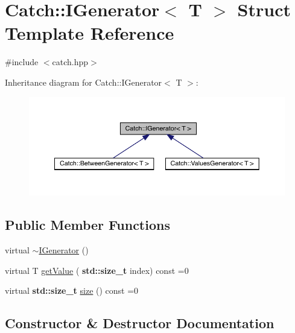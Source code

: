 \hypertarget{struct_catch_1_1_i_generator}{}\section{Catch\+:\+:I\+Generator$<$ T $>$ Struct Template Reference}
\label{struct_catch_1_1_i_generator}


{\ttfamily \#include $<$catch.\+hpp$>$}



Inheritance diagram for Catch\+:\+:I\+Generator$<$ T $>$\+:
\nopagebreak
\begin{figure}[H]
\begin{center}
\leavevmode
\includegraphics[width=350pt]{struct_catch_1_1_i_generator__inherit__graph}
\end{center}
\end{figure}
\subsection*{Public Member Functions}
\begin{DoxyCompactItemize}
\item 
virtual \hyperlink{struct_catch_1_1_i_generator_a0622037f4617e09aa8c584b0144d4a1a}{$\sim$\+I\+Generator} ()
\item 
virtual T \hyperlink{struct_catch_1_1_i_generator_ad69e937cb66dba3ed9429c42abf4fce3}{get\+Value} (\textbf{ std\+::size\+\_\+t} index) const =0
\item 
virtual \textbf{ std\+::size\+\_\+t} \hyperlink{struct_catch_1_1_i_generator_a2e317253b03e838b6065ce69719a198e}{size} () const =0
\end{DoxyCompactItemize}


\subsection{Constructor \& Destructor Documentation}
\mbox{\label{struct_catch_1_1_i_generator_a0622037f4617e09aa8c584b0144d4a1a}} 

